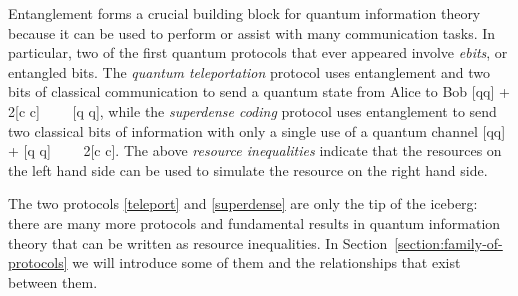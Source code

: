 \documentclass[aps,11pt,twoside,letterpaper]{article}
\theoremstyle{plain}
\theoremstyle{definition}
\begin{document}
			Entanglement forms a crucial building block for quantum information theory because it can be used 
			to perform or assist with many communication tasks.
			In particular, two of the first quantum protocols that ever appeared involve \emph{ebits}, 
			or entangled bits.  
			The \emph{quantum teleportation} protocol \cite{teleportation} uses entanglement and two bits of classical
			communication to send a quantum state from Alice to Bob
			\be	{}	\label{teleport}
				[qq] + 2[c \to c]	\ \ \geq \ \ 	[q \to q],
			\ee
			while the \emph{superdense coding} protocol \cite{superdense} uses entanglement to send two classical
			bits of information with only a single use of a quantum channel
			\be	{}	\label{superdense}
				[qq] + [q \to q]	\ \ \geq \ \ 	2[c \to c].
			\ee
			The above \emph{resource inequalities} indicate that the resources on the left hand side can be 
			used to simulate the resource on the right hand side.
			\index{resource!inequality}

			The two protocols \eqref{teleport} and \eqref{superdense} are only the tip of the iceberg: 
			there are many more protocols and fundamental results in quantum information theory that can be 
			written as resource inequalities.
			In Section~\ref{section:family-of-protocols} we will introduce some of them and the relationships 
			that exist between them.
			
			
\end{document}
